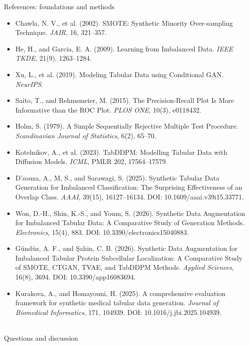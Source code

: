\documentclass[aspectratio=169,11pt]{beamer}
\begin{document}
	\begin{frame}{References: foundations and methods}
		\tiny\begin{itemize}\setlength\itemsep{0.5em}
			\item Chawla, N. V., et al. (2002). SMOTE: Synthetic Minority Over-sampling Technique. \emph{JAIR}, 16, 321--357.
			\item He, H., and Garcia, E. A. (2009). Learning from Imbalanced Data. \emph{IEEE TKDE}, 21(9), 1263--1284.
			\item Xu, L., et al. (2019). Modeling Tabular Data using Conditional GAN. \emph{NeurIPS}.
			\item Saito, T., and Rehmsmeier, M. (2015). The Precision-Recall Plot Is More Informative than the ROC Plot. \emph{PLOS ONE}, 10(3), e0118432.
			\item Holm, S. (1979). A Simple Sequentially Rejective Multiple Test Procedure. \emph{Scandinavian Journal of Statistics}, 6(2), 65--70.
			\item Kotelnikov, A., et al. (2023). TabDDPM: Modelling Tabular Data with Diffusion Models. \emph{ICML}, PMLR 202, 17564--17579.
		\end{itemize}
		\tiny\begin{itemize}\setlength\itemsep{0.8em}
			\item D'souza, A., M, S., and Sarawagi, S. (2025). Synthetic Tabular Data Generation for Imbalanced Classification: The Surprising Effectiveness of an Overlap Class. \emph{AAAI}, 39(15), 16127--16134. DOI: 10.1609/aaai.v39i15.33771.
			\item Won, D.-H., Shin, K.-S., and Youm, S. (2026). Synthetic Data Augmentation for Imbalanced Tabular Data: A Comparative Study of Generation Methods. \emph{Electronics}, 15(4), 883. DOI: 10.3390/electronics15040883.
			\item G\"und\"uz, A. F., and \c{S}ahin, C. B. (2026). Synthetic Data Augmentation for Imbalanced Tabular Protein Subcellular Localization: A Comparative Study of SMOTE, CTGAN, TVAE, and TabDDPM Methods. \emph{Applied Sciences}, 16(8), 3694. DOI: 10.3390/app16083694.
			\item Kurakova, A., and Homayouni, H. (2025). A comprehensive evaluation framework for synthetic medical tabular data generation. \emph{Journal of Biomedical Informatics}, 171, 104939. DOI: 10.1016/j.jbi.2025.104939.
		\end{itemize}
	\end{frame}
	\begin{frame}[plain]\centering{}\\[1em]{\Large Questions and discussion}\end{frame}
\end{document}
